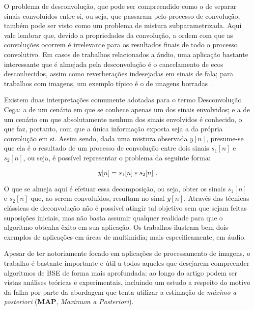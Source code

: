 O problema de desconvolução, que pode ser compreendido como o de separar sinais convoluídos entre si, ou seja, que passaram pelo processo de convolução, também pode ser visto como um problema de mistura subparametrizada. Aqui vale lembrar que, devido a propriedades da convolução, a ordem com que as convoluções ocorrem é irrelevante para os resultados finais de todo o processo convolutivo. Em casos de trabalhos relacionados a áudio, uma aplicação bastante interessante que é almejada pela desconvolução é o cancelamento de ecos desconhecidos, assim como reverberações indesejadas em sinais de fala; para trabalhos com imagens, um exemplo típico é o de imagens borradas \citep{Bell:1995:IAB:211676.211677}.

Existem duas interpretações comumente adotadas para o termo Desconvolução Cega: a de um cenário em que se conhece apenas um dos sinais envolvidos; e a de um cenário em que absolutamente nenhum dos sinais envolvidos é conhecido, o que faz, portanto, com que a única informação exposta seja a da própria convolução em si. Assim sendo, dada uma mistura observada $y[n]$, presume-se que ela é o resultado de um processo de convolução entre dois sinais $s_{1}[n]$ e $s_{2}[n]$, ou seja, é possível representar o problema da seguinte forma:

\begin{equation}
    y[n] = s_{1}[n] \ast s_{2}[n]
    \label{eq:bss_deconvolution}
    \hspace{0.1cm}.
    \vspace{0.2cm}
\end{equation}

O que se almeja aqui é efetuar essa decomposição, ou seja, obter os sinais $s_{1}[n]$ e $s_{2}[n]$ que, ao serem convoluídos, resultam no sinal $y[n]$. Através das técnicas clássicas de deconvolução não é possível atingir tal objetivo sem que sejam feitas suposições iniciais, mas não basta assumir qualquer realidade para que o algoritmo obtenha êxito em sua aplicação. Os trabalhos \citep{661479, 7077344} ilustram bem dois exemplos de aplicações em áreas de multimídia; mais especificamente, em áudio.


Apesar de ter notoriamente focado em aplicações de processamento de imagens, o trabalho \citep{levin2009understanding} é bastante importante e útil a todos aqueles que desejarem compreender algoritmos de BSE de forma mais aprofundada; ao longo do artigo podem ser vistas análises teóricas e experimentais, incluindo um estudo a respeito do motivo da falha por parte da abordagem que tenta utilizar a estimação de \textit{máximo a posteriori} (\textbf{MAP}, \textit{Maximum a Posteriori}).







